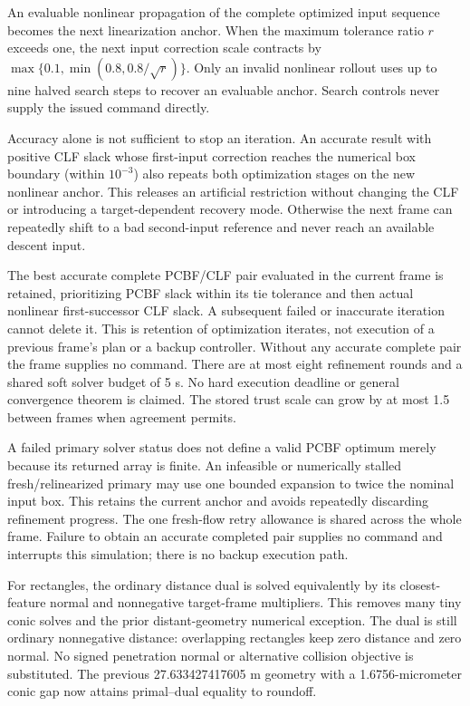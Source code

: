 \documentclass[11pt]{article}
\begin{document}
An evaluable nonlinear propagation of the complete optimized input sequence
becomes the next linearization anchor. When the maximum tolerance ratio $r$
exceeds one, the next input correction scale contracts by
$\max\{0.1,\min(0.8,0.8/\sqrt r)\}$. Only an invalid nonlinear rollout
uses up to nine halved search steps to recover an evaluable anchor. Search
controls never supply the issued command directly.

Accuracy alone is not sufficient to stop an iteration. An accurate result
with positive CLF slack whose first-input correction reaches the numerical
box boundary (within $10^{-3}$) also repeats both optimization stages on the
new nonlinear anchor. This releases an artificial restriction without
changing the CLF or introducing a target-dependent recovery mode. Otherwise
the next frame can repeatedly shift to a bad second-input reference and
never reach an available descent input.

The best accurate complete PCBF/CLF pair evaluated in the current frame is
retained, prioritizing PCBF slack within its tie tolerance and then actual
nonlinear first-successor CLF slack. A subsequent failed or inaccurate
iteration cannot delete it. This is retention of optimization iterates, not
execution of a previous frame's plan or a backup controller. Without any
accurate complete pair the frame supplies no command. There are at most eight
refinement rounds and a shared soft solver budget of 5 s. No hard execution
deadline or general convergence theorem is claimed. The stored trust scale
can grow by at most 1.5 between frames when agreement permits.

A failed primary solver status does not define a valid PCBF optimum merely
because its returned array is finite. An infeasible or numerically stalled
fresh/relinearized primary may use one bounded expansion to twice the nominal
input box. This retains the current anchor and avoids repeatedly discarding
refinement progress. The one fresh-flow retry allowance is shared across the
whole frame. Failure to obtain an accurate completed pair supplies no command
and interrupts this simulation; there is no backup execution path.

For rectangles, the ordinary distance dual is solved equivalently by its
closest-feature normal and nonnegative target-frame multipliers. This removes
many tiny conic solves and the prior distant-geometry numerical exception.
The dual is still ordinary nonnegative distance: overlapping rectangles keep
zero distance and zero normal. No signed penetration normal or alternative
collision objective is substituted. The previous 27.633427417605 m geometry
with a 1.6756-micrometer conic gap now attains primal--dual equality to roundoff.
\end{document}
